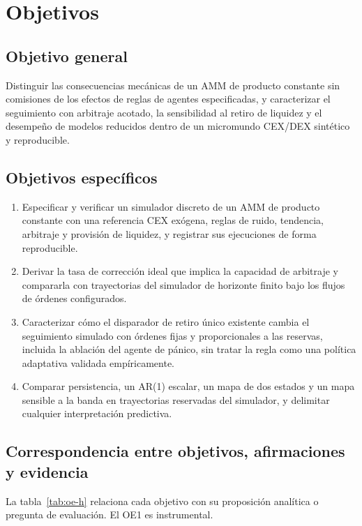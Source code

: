 \chapter{Objetivos}
\label{cap:objetivos}

\section{Objetivo general}

Distinguir las consecuencias mecánicas de un AMM de producto constante sin comisiones de los efectos de reglas de agentes especificadas, y caracterizar el seguimiento con arbitraje acotado, la sensibilidad al retiro de liquidez y el desempeño de modelos reducidos dentro de un micromundo CEX/DEX sintético y reproducible.

\section{Objetivos específicos}

\begin{enumerate}[label=\textbf{OE\arabic*.}, leftmargin=3em]
  \item Especificar y verificar un simulador discreto de un AMM de producto constante con una referencia CEX exógena, reglas de ruido, tendencia, arbitraje y provisión de liquidez, y registrar sus ejecuciones de forma reproducible.
  \item Derivar la tasa de corrección ideal que implica la capacidad de arbitraje y compararla con trayectorias del simulador de horizonte finito bajo los flujos de órdenes configurados.
  \item Caracterizar cómo el disparador de retiro único existente cambia el seguimiento simulado con órdenes fijas y proporcionales a las reservas, incluida la ablación del agente de pánico, sin tratar la regla como una política adaptativa validada empíricamente.
  \item Comparar persistencia, un AR(1) escalar, un mapa de dos estados y un mapa sensible a la banda en trayectorias reservadas del simulador, y delimitar cualquier interpretación predictiva.
\end{enumerate}

\section{Correspondencia entre objetivos, afirmaciones y evidencia}

La tabla~\ref{tab:oe-h} relaciona cada objetivo con su proposición analítica o pregunta de evaluación. El OE1 es instrumental.

